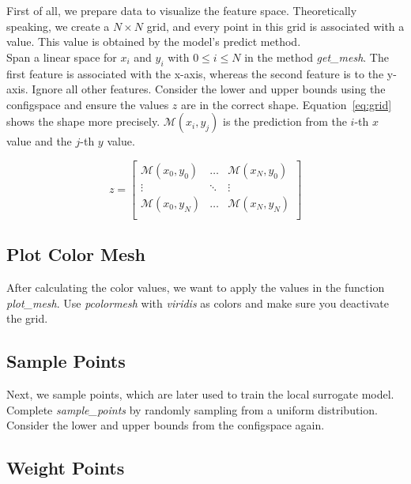 \documentclass[a4paper]{article}
\begin{document}
\noindent First of all, we prepare data to visualize the feature space. Theoretically speaking, we create a $N\times N$ grid, and every point in this grid is associated with a value. This value is obtained by the model's predict method.\\

\noindent Span a linear space for $x_i$ and $y_i$ with $0 \leq i \leq N$ in the method \textit{get\_mesh}. The first feature is associated with the x-axis, whereas the second feature is to the y-axis. Ignore all other features. Consider the lower and upper bounds using the configspace and ensure the values $z$ are in the correct shape. Equation~\ref{eq:grid} shows the shape more precisely. $\mathcal{M}(x_i, y_j)$ is the prediction from the $i$-th $x$ value and the $j$-th $y$ value. 

\begin{equation}
z
=
\begin{bmatrix}
\mathcal{M}(x_0, y_0) & \dots & \mathcal{M}(x_N, y_0)\\
\vdots & \ddots & \vdots\\
\mathcal{M}(x_0, y_N) & \dots & \mathcal{M}(x_N, y_N)\\
\end{bmatrix}
\label{eq:grid}
\end{equation}


\subsection{Plot Color Mesh}

After calculating the color values, we want to apply the values in the function \textit{plot\_mesh}. Use \textit{pcolormesh} with \textit{viridis} as colors and make sure you deactivate the grid.



\subsection{Sample Points}

Next, we sample points, which are later used to train the local surrogate model. Complete \textit{sample\_points} by randomly sampling from a uniform distribution. Consider the lower and upper bounds from the configspace again.


\subsection{Weight Points}
\end{document}
